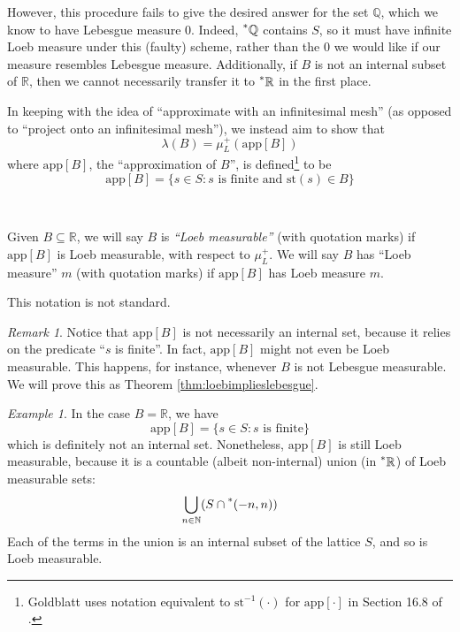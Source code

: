 \documentclass[11pt]{amsart}
\theoremstyle{remark}
\newtheorem*{remark}{Remark}
\newtheorem*{example}{Example}
\newcommand{\st}{\mathrm{st}}
\newcommand{\app}[1]{\mathrm{app}\left[#1\right]}
\newcommand{\hyp}[1][\mathbb{R}]{\prescript{*}{}{#1}}
\begin{document}
However, this procedure fails to give the desired answer for the set $\mathbb{Q}$, which we know to have Lebesgue measure $0$.
Indeed, $\hyp[\mathbb{Q}]$ contains $S$, so it must have infinite Loeb measure under this (faulty) scheme, rather than the $0$ we would like if our measure resembles Lebesgue measure.
Additionally, if $B$ is not an internal subset of $\mathbb{R}$, then we cannot necessarily transfer it to $\hyp$ in the first place.

In keeping with the idea of ``approximate with an infinitesimal mesh'' (as opposed to ``project onto an infinitesimal mesh''), we instead aim to show that $$\lambda(B) = \mu_L^+(\app{B})$$
where $\app{B}$, the ``approximation of $B$'', is defined\footnote{Goldblatt uses notation equivalent to $\st^{-1}(\cdot)$ for $\app{\cdot}$ in Section 16.8 of \cite{goldblatt}.} to be $$\app{B} = \{ s \in S: \text{$s$ is finite and $\st(s) \in B$} \}$$ 

\

\begin{defn}Given $B \subseteq \mathbb{R}$, we will say $B$ is \emph{``Loeb measurable''} (with quotation marks) if $\app{B}$ is Loeb measurable, with respect to $\mu_L^+$.
We will say $B$ has ``Loeb measure'' $m$ (with quotation marks) if $\app{B}$ has Loeb measure $m$.

This notation is not standard.
\end{defn}

\begin{remark}Notice that $\app{B}$ is not necessarily an internal set, because it relies on the predicate ``$s$ is finite''.
In fact, $\app{B}$ might not even be Loeb measurable.
This happens, for instance, whenever $B$ is not Lebesgue measurable.
We will prove this as Theorem \ref{thm:loebimplieslebesgue}.
\end{remark}

\begin{example}
In the case $B = \mathbb{R}$, we have $$\app{B} = \{ s \in S: \text{$s$ is finite} \}$$
which is definitely not an internal set.
Nonetheless, $\app{B}$ is still Loeb measurable, because it is a countable (albeit non-internal) union (in $\hyp$) of Loeb measurable sets:
$$\bigcup_{n \in \mathbb{N}} (S \cap \hyp[(-n, n]))$$
Each of the terms in the union is an internal subset of the lattice $S$, and so is Loeb measurable.
\end{example}
\end{document}
